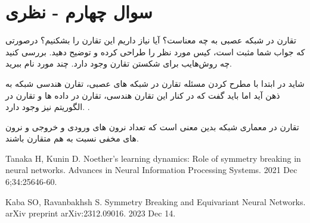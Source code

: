 \section{سوال چهارم - نظری}

تقارن در شبکه عصبی به چه معناست؟ آیا نیاز داریم این تقارن را بشکنیم؟ درصورتی که جواب شما مثبت است، کیس مورد نظر را طراحی کرده و توضیح دهید. بررسی کنید چه روش‌هایب برای شکستن تقارن وجود دارد. چند مورد نام ببرید.





\begin{qsolve}
 	شاید در ابتدا با مطرح کردن مسئله تقارن در شبکه های عصبی، تقارن هندسی شبکه به ذهن آید اما باید گفت که در کنار این تقارن هندسی، تقارن در داده ها و تقارن در الگوریتم نیز وجود دارد. \cite{ref1}.
 	
 	تقارن در معماری شبکه بدین معنی است که تعداد نرون های ورودی و خروجی و نرون های مخفی نسبت به هم متقارن باشند.



\end{qsolve}

















\begin{latin}
	\begin{thebibliography}{9}
		Tanaka H, Kunin D. Noether’s learning dynamics: Role of symmetry breaking in neural networks. Advances in Neural Information Processing Systems. 2021 Dec 6;34:25646-60.
		
		Kaba SO, Ravanbakhsh S. Symmetry Breaking and Equivariant Neural Networks. arXiv preprint arXiv:2312.09016. 2023 Dec 14.
	\end{thebibliography} 
\end{latin}